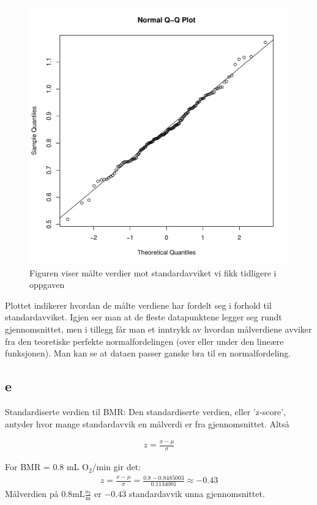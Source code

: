 \begin{figure}[H]
        \centering
        \includegraphics[width=0.9\linewidth]{Rplots.pdf}
        \caption{Figuren viser målte verdier mot standardavviket vi fikk tidligere i oppgaven}
        \label{fig:QQ}
\end{figure}
Plottet indikerer hvordan de målte verdiene har fordelt seg i forhold til standardavviket. Igjen ser man at de fleste datapunktene legger seg rundt gjennomsnittet, men i tillegg får man et inntrykk av hvordan målverdiene avviker fra den teoretiske perfekte normalfordelingen (over eller under den lineære funksjonen). Man kan se at dataen passer ganske bra til en normalfordeling.

\subsection*{e}

Standardiserte verdien til BMR:
Den standardiserte verdien, eller 'z-score', antyder hvor mange standardavvik en målverdi er fra gjennomsnittet. Altså

\begin{align*}
    z = \frac{x - \mu}{\sigma}
\end{align*}

For BMR = 0.8 mL O$_2$/min gir det:
\begin{align*}
    z = \frac{x - \mu}{\sigma} = \frac{0.8 - 0.8485003}{0.1134001} \approx -0.43
\end{align*}
Målverdien på $0.8\mathrm{mL}\frac{o_2}{\mathrm{m}}$ er $-0.43$ standardavvik unna gjennomsnittet.

